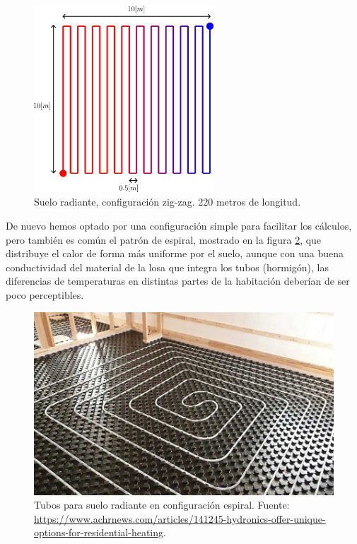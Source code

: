 \begin{figure}[h] \centering
	\centering
	\includegraphics[width=0.6\textwidth]{./capitulos/resultados_discusion/images/esquema_tubos_suelo.png}
	\caption{Suelo radiante, configuración zig-zag. 220 metros de longitud.}
	\label{fig:esquema_tubos_suelo}
\end{figure}

De nuevo hemos optado por una configuración simple para facilitar los cálculos,
pero también es común el patrón de espiral, mostrado en la figura \ref{fig:spiral_pattern_floor},
que distribuye el calor de forma más uniforme por el suelo, aunque con una buena
conductividad del material de la losa que integra los tubos (hormigón), las diferencias de
temperaturas en distintas partes de la habitación deberían de ser poco perceptibles.

\begin{figure}[h] \centering
	\centering
	\includegraphics[width=1\textwidth]{./capitulos/resultados_discusion/images/spiral_pattern_floor.jpg}
	\caption{Tubos para suelo radiante en configuración espiral. Fuente: \url{https://www.achrnews.com/articles/141245-hydronics-offer-unique-options-for-residential-heating}.}
	\label{fig:spiral_pattern_floor}
\end{figure}


